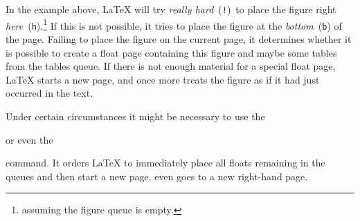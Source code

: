\noindent In the example above,
\LaTeX{} will try \emph{really hard}~(\texttt{!})\ to place the figure
right \emph{here}~(\texttt{h}).\footnote{assuming the figure queue is
  empty.} If this is not possible, it tries to place the figure at the
\emph{bottom}~(\texttt{b}) of the page.  Failing to place the figure
on the current page, it determines whether it is possible to create a float
page containing this figure and maybe some tables from the tables
queue. If there is not enough material for a special float page,
\LaTeX{} starts a new page, and once more treats the figure as if it
had just occurred in the text.

Under certain circumstances it might be necessary to use the

\begin{lscommand}
 or even the 
\end{lscommand}

\noindent command. It orders \LaTeX{} to immediately place all
floats remaining in the queues and then start a new
page.  even goes to a new right-hand page.

